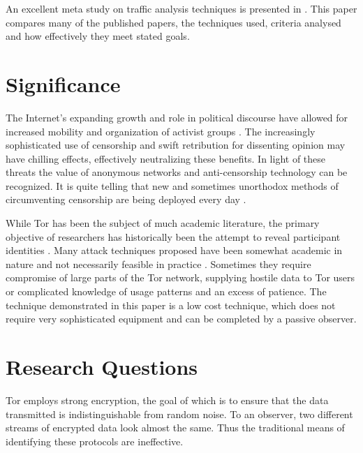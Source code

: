 \documentclass{ecuthesis}
\begin{document}
An excellent meta study on traffic analysis techniques is presented in
\textcite{Nguyen:2008p3837}. This paper compares many of the published papers,
the techniques used, criteria analysed and how effectively they meet stated
goals.

\section{Significance}

The Internet's expanding growth \parencite{Miniwatts-Marketing-Group:2010uq} and
role in political discourse \parencite{Bonchek:1997p3455} have allowed for
increased mobility and organization of activist groups
\parencite{Alexander:2011kx,Anderson:2011vn}. The increasingly sophisticated use
of censorship \parencite{Crandall:2007p6165,Karlin:2009p6166} and swift
retribution for dissenting opinion
\parencite{website:china-yahoo-torture,website:vietnam-bloggers-arrested,website:egypt-arrests,website:blogger-arrests}
may have chilling effects, effectively neutralizing these benefits. In light of
these threats the value of anonymous networks and anti-censorship technology can
be recognized. It is quite telling that new and sometimes unorthodox methods of
circumventing censorship are being deployed every day
\parencite{The-Economist:2011fk,Brading:2011ys}.

While Tor has been the subject of much academic literature, the primary
objective of researchers has historically been the attempt to reveal participant
identities \parencite[3]{Murdoch:2005p325}.  Many attack techniques proposed
have been somewhat academic in nature and not necessarily feasible in practice
\parencite{Raccoon:2008fk}. Sometimes they require compromise of large parts of
the Tor network, supplying hostile data to Tor users or complicated knowledge of
usage patterns and an excess of patience. The technique demonstrated in this
paper is a low cost technique, which does not require very sophisticated
equipment and can be completed by a passive observer.

\section{Research Questions}

Tor employs strong encryption, the goal of which is to ensure that the data
transmitted is indistinguishable from random noise. To an observer, two
different streams of encrypted data look almost the same. Thus the traditional
means of identifying these protocols are ineffective.
\end{document}
